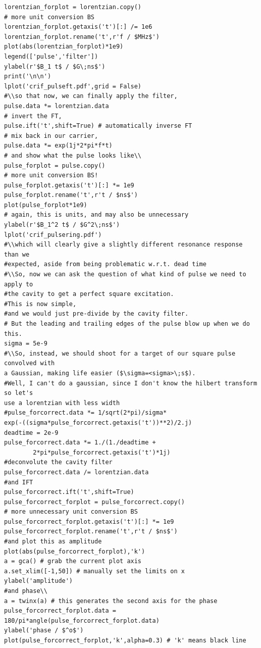 \begin{lstlisting}
lorentzian_forplot = lorentzian.copy()
# more unit conversion BS
lorentzian_forplot.getaxis('t')[:] /= 1e6
lorentzian_forplot.rename('t',r'f / $MHz$')
plot(abs(lorentzian_forplot)*1e9)
legend(['pulse','filter'])
ylabel(r'$B_1 t$ / $G\;ns$')
print('\n\n')
lplot('crif_pulseft.pdf',grid = False)
#\\so that now, we can finally apply the filter,
pulse.data *= lorentzian.data
# invert the FT,
pulse.ift('t',shift=True) # automatically inverse FT
# mix back in our carrier,
pulse.data *= exp(1j*2*pi*f*t)
# and show what the pulse looks like\\
pulse_forplot = pulse.copy()
# more unit conversion BS!
pulse_forplot.getaxis('t')[:] *= 1e9
pulse_forplot.rename('t',r't / $ns$')
plot(pulse_forplot*1e9)
# again, this is units, and may also be unnecessary
ylabel(r'$B_1^2 t$ / $G^2\;ns$')
lplot('crif_pulsering.pdf')
#\\which will clearly give a slightly different resonance response than we
#expected, aside from being problematic w.r.t. dead time
#\\So, now we can ask the question of what kind of pulse we need to apply to
#the cavity to get a perfect square excitation.
#This is now simple,
#and we would just pre-divide by the cavity filter.
# But the leading and trailing edges of the pulse blow up when we do this.
sigma = 5e-9
#\\So, instead, we should shoot for a target of our square pulse convolved with
a Gaussian, making life easier ($\sigma=<sigma>\;s$).
#Well, I can't do a gaussian, since I don't know the hilbert transform so let's
use a lorentzian with less width
#pulse_forcorrect.data *= 1/sqrt(2*pi)/sigma*
exp(-((sigma*pulse_forcorrect.getaxis('t'))**2)/2.j)
deadtime = 2e-9
pulse_forcorrect.data *= 1./(1./deadtime +
        2*pi*pulse_forcorrect.getaxis('t')*1j)
#deconvolute the cavity filter
pulse_forcorrect.data /= lorentzian.data
#and IFT
pulse_forcorrect.ift('t',shift=True)
pulse_forcorrect_forplot = pulse_forcorrect.copy()
# more unnecessary unit conversion BS
pulse_forcorrect_forplot.getaxis('t')[:] *= 1e9
pulse_forcorrect_forplot.rename('t',r't / $ns$')
#and plot this as amplitude
plot(abs(pulse_forcorrect_forplot),'k')
a = gca() # grab the current plot axis
a.set_xlim([-1,50]) # manually set the limits on x
ylabel('amplitude')
#and phase\\
a = twinx(a) # this generates the second axis for the phase
pulse_forcorrect_forplot.data = 180/pi*angle(pulse_forcorrect_forplot.data)
ylabel('phase / $^o$')
plot(pulse_forcorrect_forplot,'k',alpha=0.3) # 'k' means black line

\end{lstlisting}
